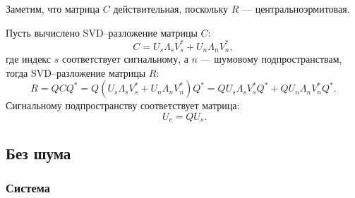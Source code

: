 Заметим, что матрица $C$ действительная, поскольку $R$ --- центральноэрмитовая.

Пусть вычислено SVD--разложение матрицы $C$:
\[
    C = U_s \Lambda_s V_s^* + U_n \Lambda_n V_n^* ,
\]
где индекс $s$ соответствует сигнальному, а $n$ --- шумовому подпространствам, тогда SVD--разложение матрицы $R$:
\[
    R
    = Q C Q^*
    = Q \left( U_s \Lambda_s V_s^* + U_n \Lambda_n V_n^* \right) Q^*
    = Q U_s \Lambda_s V_s^* Q^* + Q U_n \Lambda_n V_n^* Q^* .
\]
Сигнальному подпространству соответствует матрица:
\begin{equation}~\label{direction:svd_signal_columns}
    U_c = Q U_s .
\end{equation}

\subsection{Без шума}

\subsubsection{Система}

